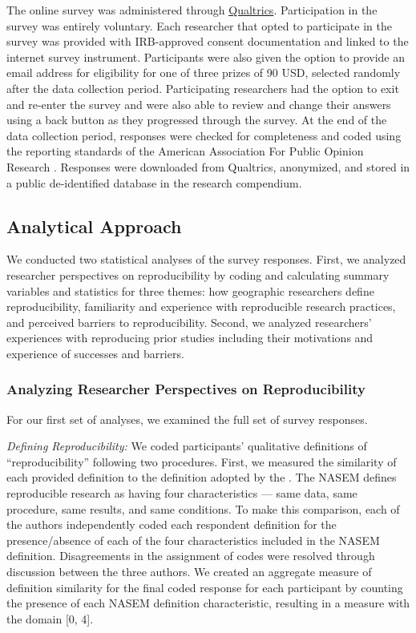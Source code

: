 \documentclass[]{interact}
\theoremstyle{plain}%
\theoremstyle{definition}
\theoremstyle{remark}
\begin{document}
The online survey was administered through \href{https://www.qualtrics.com/}{Qualtrics}. 
Participation in the survey was entirely voluntary. 
Each researcher that opted to participate in the survey was provided with IRB-approved consent documentation and linked to the internet survey instrument. 
Participants were also given the option to provide an email address for eligibility for one of three  prizes of 90 USD, selected randomly after the data collection period.
Participating researchers had the option to exit and re-enter the survey and were also able to review and change their answers using a back button as they progressed through the survey.
At the end of the data collection period, responses were checked for completeness and coded using the reporting standards of the American Association For Public Opinion Research \citep{aaporstandards}.
Responses were downloaded from Qualtrics, anonymized, and stored in a public de-identified database in the research compendium.

\subsection*{Analytical Approach}

We conducted two statistical analyses of the survey responses.
First, we analyzed researcher perspectives on reproducibility by coding and calculating summary variables and statistics for three themes: how geographic researchers define reproducibility, familiarity and experience with reproducible research practices, and perceived barriers to reproducibility.
Second, we analyzed researchers' experiences with reproducing prior studies including their motivations and experience of successes and barriers.

\subsubsection*{Analyzing Researcher Perspectives on Reproducibility}

\noindent For our first set of analyses, we examined the full set of survey responses.

\textit{Defining Reproducibility:} 
We coded participants' qualitative definitions of ``reproducibility'' following two procedures.
First, we measured the similarity of each provided definition to the definition adopted by the \citet{NASEM2019}. 
The NASEM defines reproducible research as having four characteristics --- same data, same procedure, same results, and same conditions.
To make this comparison, each of the authors independently coded each respondent definition for the presence/absence of each of the four characteristics included in the NASEM definition.
Disagreements in the assignment of codes were resolved through discussion between the three authors.
We created an aggregate measure of definition similarity for the final coded response for each participant by counting the presence of each NASEM definition characteristic, resulting in a measure with the domain [0, 4].
\end{document}
